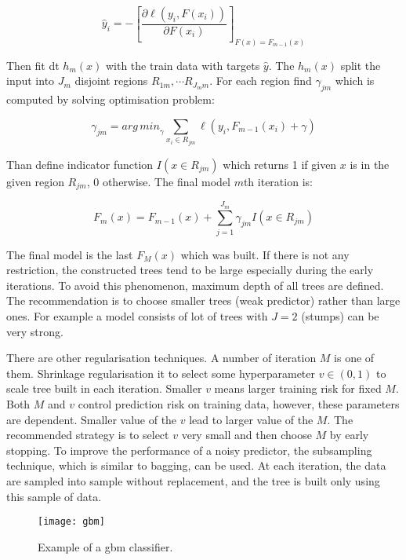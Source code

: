 \documentclass[thesis=M,english]{FITthesis}[2012/10/20]
\begin{document}
\begin{equation}
\hat{y}_i = - \left[\frac{\partial\ell(y_i,F(x_i))}{\partial F(x_i)}\right]_{F(x) = F_{m-1}(x)}
\end{equation}

\noindent Then fit \gls{dt} $h_m(x)$ with the train data with targets $\hat{y}$. The $h_m(x)$ split the input into $J_m$ disjoint regions $R_{1m}, \cdots R_{J_mm}$. For each region find $\gamma_{jm}$ which is computed by solving optimisation problem:

\begin{equation}
\gamma_{jm} = {arg\,min}_{\gamma} \sum_{x_i \in R_{jm}}{\ell(y_i, F_{m-1}(x_i) + \gamma)}
\end{equation}

Than define indicator function $I(x \in R_{jm})$ which returns 1 if given $x$ is in the given region $R_{jm}$, 0 otherwise. The final model $m$th iteration is:

\begin{equation}
F_m(x) = F_{m-1}(x) + \sum_{j=1}^{J_m}{\gamma_{jm} I(x \in R_{jm})}
\end{equation}

The final model is the last $F_M(x)$ which was built. If there is not any restriction, the constructed trees tend to be large especially during the early iterations. To avoid this phenomenon, maximum depth of all trees are defined. The recommendation is to choose smaller trees (weak predictor) rather than large ones. For example a model consists of lot of trees with $J = 2$ (stumps) can be very strong.\cite[362]{Hastie2001statisticallearning}

There are other regularisation techniques.\cite[361--365]{Hastie2001statisticallearning} A number of iteration $M$ is one of them. Shrinkage regularisation it to select some hyperparameter $v \in (0,1)$ to scale tree built in each iteration. Smaller $v$ means larger training risk for fixed $M$. Both $M$ and $v$ control prediction risk on training data, however, these parameters are dependent. Smaller value of the $v$ lead to larger value of the $M$. The recommended strategy is to select $v$ very small and then choose $M$ by early stopping.\cite[364]{Hastie2001statisticallearning} To improve the performance of a noisy predictor, the subsampling technique, which is similar to bagging, can be used. At each iteration, the data are sampled into sample without replacement, and the tree is built only using this sample of data.

\begin{figure}[ht]\centering

    \texttt{[image: gbm]}
    \caption{Example of a \gls{gbm} classifier.}\label{fig:gbm}
\end{figure}
\vspace*{0.5cm}
\end{document}
